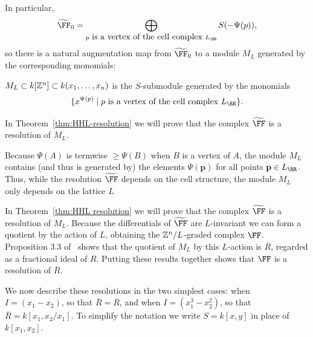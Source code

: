 \documentclass{amsart}
\begin{document}
In particular,
$$
\tF_{0} = \bigoplus_{p \hbox{ is a vertex of the cell complex }L_{\RR}}S(-\Psi(p)),
$$
so there is a natural augmentation map from $\tF_{0}$ to a module $M_{L}$ generated by the corresponding monomials:

\begin{defn}\label{def:M_{L}}
 $M_{L}\subset k[\mathbb Z^{n}]\subset k(x_{1}, \dots, x_{n})$ is the $S$-submodule generated by the monomials
 $$
 \{x^{\Psi(p)} \mid p \hbox{ is a vertex of the cell complex }L_{\RR}\}.
 $$
\end{defn}


In Theorem~\ref{thm:HHL-resolution} we will prove that the complex $\tF$ is a resolution of $M_L$.

\begin{remark}
 Because $\Psi(A)$ is termwise $\geq \Psi(B)$ when $B$ is a vertex of $A$, the module $M_{L}$ contains (and thus is generated by) the elements $\Psi(\mathbf{p})$ for all points $\mathbf{p}\in L_{\RR}$. Thus, while the resolution $\tF$ depends on the cell structure, the module $M_L$ only depends on the lattice $L$
\end{remark}

In Theorem~\ref{thm:HHL resolution} we will prove that the complex $\tF$ is a resolution of $M_L$.
Because the differentials of $\tF$ are $L$-invariant we can form a quotient by the action of $L$, obtaining the $\mathbb Z^{n}/L$-graded complex $\FF$. Proposition 3.3 of~\cite{BCHSY} shows  that the quotient of $M_L$ by this $L$-action is $\overline{R}$, regarded as a fractional ideal of $R$. Putting these results together shows that  $\FF$ is a resolution of $\overline R$.



We now describe these resolutions in the two simplest cases: when $I = (x_1-x_2)$, so that $\overline R = R$, and when $I = (x_1^3-x_2^2)$, so that $\overline R = k[x_1,x_2/x_1]$. 
To simplify the notation we write $S =k[x,y]$ in place of $k[x_1,x_2]$.  
\end{document}
